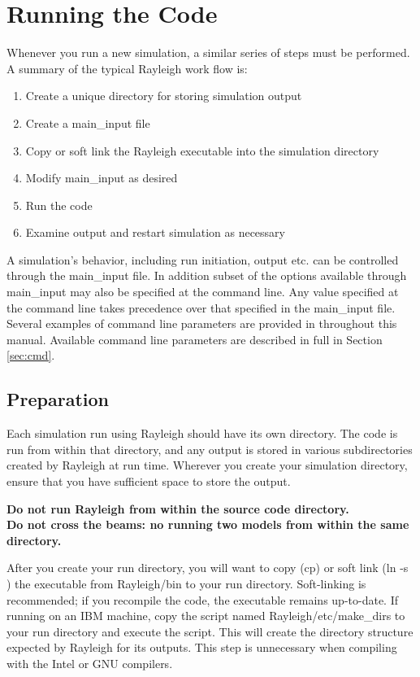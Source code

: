 \clearpage
\section{Running the Code}\label{sec:running}
Whenever you run a new simulation, a similar series of steps must be performed.  A summary of the typical Rayleigh work flow is:
\begin{enumerate}
\item Create a unique directory for storing simulation output
\item Create a main\_input file
\item Copy or soft link the Rayleigh executable into the simulation directory
\item Modify main\_input as desired
\item Run the code
\item Examine output and restart simulation as necessary
\end{enumerate}

A simulation's behavior, including run initiation, output etc. can be controlled through the main\_input file.  In addition subset of the options available through main\_input may also be specified at the command line.  Any value specified at the command line takes precedence over that specified in the main\_input file.   Several examples of command line parameters are provided in throughout this manual.  Available command line parameters are described in full in Section \ref{sec:cmd}.

\subsection{Preparation}
Each simulation run using Rayleigh should have its own directory.  The code is run from within that directory, and any output is stored in various subdirectories created by Rayleigh at run time.  Wherever you create your simulation directory, ensure that you have sufficient space to store the output.

\textbf{Do not run Rayleigh from within the source code directory.
\\ 
Do not cross the beams: no running two models from within the same directory.}

After you create your run directory, you will want to copy (cp) or soft link (ln -s ) the executable from Rayleigh/bin to your run directory.  Soft-linking is recommended; if you recompile the code, the executable remains up-to-date.  If running on an IBM machine, copy the script named Rayleigh/etc/make\_dirs to your run directory and execute the script.  This will create the directory structure expected by Rayleigh for its outputs.  This step is unnecessary when compiling with the Intel or GNU compilers.

